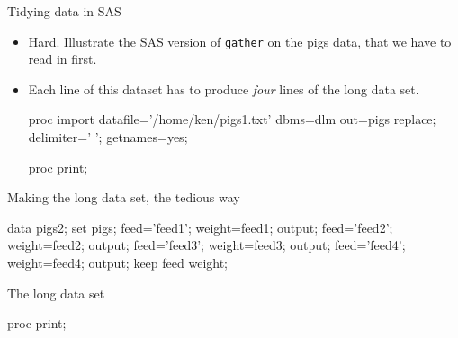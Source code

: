 \documentclass[unknownkeysallowed]{beamer}\usepackage[]{graphicx}\usepackage[]{color}
\begin{document}
\begin{frame}[fragile]{Tidying data in SAS}
  
  \begin{itemize}
  \item Hard. Illustrate the SAS version
    of \texttt{gather} on the pigs data, that we have to read in first.
  \item Each line of this dataset has to produce \emph{four} lines
    of the long data set. 
    
    \begin{Datastep}
proc import 
  datafile='/home/ken/pigs1.txt'
  dbms=dlm out=pigs replace;
  delimiter=' ';
  getnames=yes;
    \end{Datastep}
    
    \begin{Sascode}[store=tn]
proc print;      
    \end{Sascode}
    
    
  \end{itemize}
  
\end{frame}

\begin{frame}[fragile]{Making the long data set, the tedious way}
  
  \begin{Datastep}
data pigs2;
  set pigs;
  feed='feed1';
  weight=feed1;
  output;
  feed='feed2';
  weight=feed2;
  output;
  feed='feed3';
  weight=feed3;
  output;
  feed='feed4';
  weight=feed4;
  output;
  keep feed weight;
  \end{Datastep}
  
\end{frame}

\begin{frame}[fragile]{The long data set}
  
  \begin{Sascode}[store=to]
proc print;    
  \end{Sascode}
  
  
\end{frame}
\end{document}
